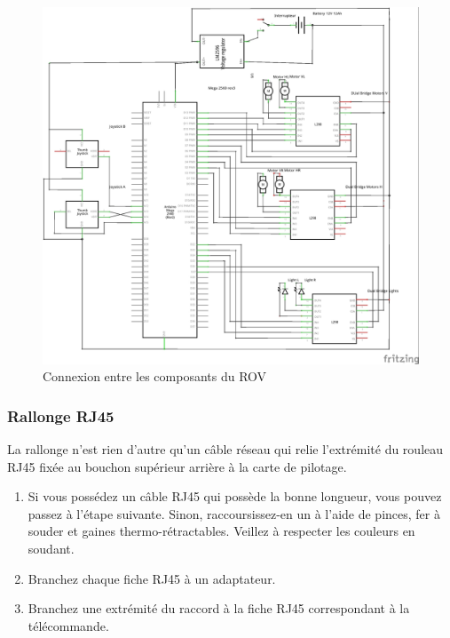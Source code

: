 \documentclass[11pt,a4paper]{article}
\begin{document}
          \begin{figure}[H]
            \centering
            \includegraphics[scale=0.9]{schemaROV.jpg}
            \caption{Connexion entre les composants du ROV}
            \label{figConnexions}
          \end{figure}

      
        \subsubsection{Rallonge RJ45}
          La rallonge n'est rien d'autre qu'un câble réseau qui relie l'extrémité du rouleau RJ45 fixée au bouchon supérieur arrière à la carte de pilotage. 
          
          \begin{enumerate}
            \item Si vous possédez un câble RJ45 qui possède la bonne longueur, vous pouvez passez à l'étape suivante. Sinon, raccoursissez-en un à l'aide de pinces, fer à souder et gaines thermo-rétractables. Veillez à respecter les couleurs en soudant.
            \item Branchez chaque fiche RJ45 à un adaptateur.
            \item Branchez une extrémité du raccord à la fiche RJ45 correspondant à la télécommande.
          \end{enumerate}
          
\end{document}
